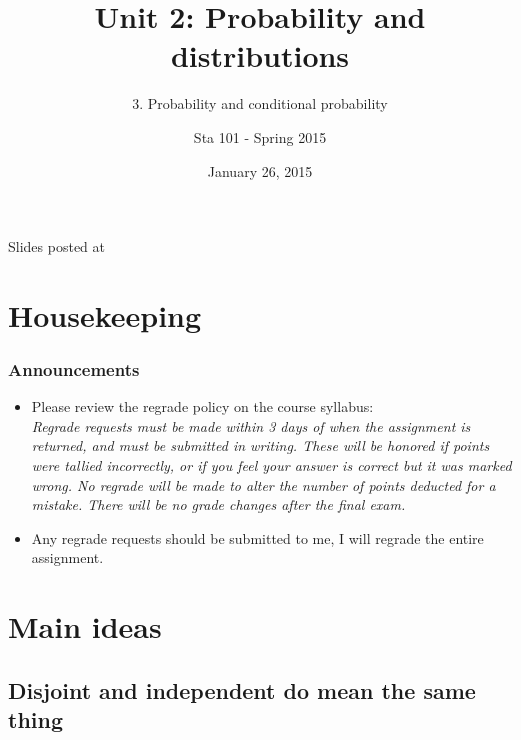 \documentclass[11pt,containsverbatim,handout,xcolor=xelatex,dvipsnames,table]{beamer}
\title{Unit 2: Probability and distributions}
\subtitle{3. Probability and conditional probability}
\author{Sta 101 - Spring 2015}
\date{January 26, 2015}
\institute{Duke University, Department of Statistical Science}
\begin{document}



\begin{frame}[plain]

\titlepage
\vfill
{\scriptsize {} \hfill Slides posted at  \webLink{\CourseSite}{\CourseSite}}
\addtocounter{framenumber}{-1} 

\end{frame}


\section{Housekeeping}


\begin{frame}
\frametitle{Announcements}

\begin{itemize}

\item Please review the regrade policy on the course syllabus: \\
{\footnotesize \textit{Regrade requests must be made within 3 days of when the assignment is returned, and must be submitted in writing. These will be honored if points were tallied incorrectly, or if you feel your answer is correct but it was marked wrong. No regrade will be made to alter the number of points deducted for a mistake. There will be no grade changes after the final exam.}}

\item Any regrade requests should be submitted to me, I will regrade the entire assignment.

\end{itemize}

\end{frame}


\section{Main ideas}


\subsection{Disjoint and independent do mean the same thing}
\label{mi1}
\end{document}
